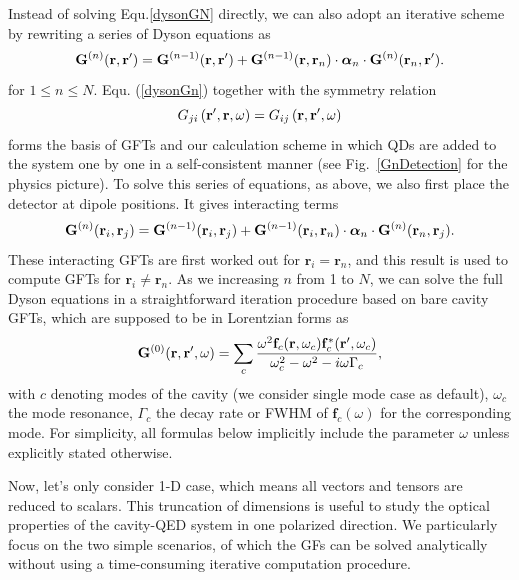 Instead of solving Equ.\eqref{dysonGN} directly, we can also adopt an iterative
scheme by rewriting a series of Dyson equations as
\begin{equation}
 \label{dysonGn}
\Gn(\rr)=\Gm1(\rr)+{\Gm1(\rrn)\cdot {\bm \alpha}_n \cdot \Gn(\mathbf{r}_n,\mathbf{r}')}.
\end{equation}
for $1 \leq  n \leq  N$. Equ. (\ref{dysonGn}) together with the symmetry relation
\begin{equation}
\label{symG2}
 G_{ji} \left(\mathbf{r}',\mathbf{r},\omega\right) = G_{ij} \left(\mathbf{r},\mathbf{r}',\omega\right)
\end{equation}
 forms the basis of GFTs and our calculation scheme in which QDs are
added to the system one by one in a self-consistent manner (see Fig.~\ref{GnDetection} for the physics picture). To solve this series of equations, as above, we also first place the detector at dipole positions. It gives interacting terms
\begin{equation}
\label{dysonGnij}
\Gn(\mathbf{r}_i,\mathbf{r}_j)=\Gm1(\mathbf{r}_i,\mathbf{r}_j)+{\Gm1(\mathbf{r}_i,\mathbf{r}_n)\cdot {\bm \alpha}_n\cdot \Gn(\mathbf{r}_n,\mathbf{r}_j)}.
\end{equation}
These interacting GFTs are first worked out for $\mathbf{r}_i=\mathbf{r}_n$, and this result is used to compute GFTs for $\mathbf{r}_i \neq \mathbf{r}_n$. As we increasing $n$ from 1 to $N$, we can solve the full Dyson equations in a straightforward iteration procedure based on bare cavity GFTs, which are supposed to be in Lorentzian forms as
\begin{equation}
 \label{Gcav}
\mathbf{G}^{(0)}(\mathbf{r},\mathbf{r}',\omega)=\sum_{c}{\frac{\omega^2\mathbf{f}_{c}(\mathbf{r},\omega_{c})\mathbf{f}_{c}^*(\mathbf{r}',\omega_{c})}
{\omega_{c}^2-\omega^2-i\omega\Gamma_{c}}},
\end{equation}
with $c$ denoting modes of the cavity (we consider single mode case as default), $\omega_c$ the mode resonance, $\Gamma_{c}$ the decay rate or FWHM of $\mathbf{f}_{c}(\omega)$ for the corresponding mode.
For simplicity, all formulas below implicitly include the parameter $\omega$ unless explicitly stated otherwise.

Now, let's only consider 1-D case, which means all vectors and tensors are reduced to scalars. This truncation of dimensions is useful to study the optical properties of the cavity-QED system in one polarized direction. We particularly focus on the two simple scenarios, of which the GFs can be solved analytically without using a time-consuming iterative computation procedure.

